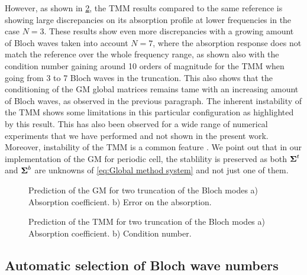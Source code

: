 However, as shown in \cref{fig:case10cond}, the TMM results compared to the same reference is showing large discrepancies on its absorption profile at lower frequencies in the case $N=3$. These results show even more discrepancies with a growing amount of Bloch waves taken into account $N=7$, where the absorption response does not match the reference over the whole frequency range, as shown also with the condition number gaining around 10 orders of magnitude for the TMM when going from 3 to 7 Bloch waves in the truncation. This also shows that the conditioning of the GM global matrices remains tame with an increasing amount of Bloch waves, as observed in the previous paragraph. The inherent instability of the TMM shows some limitations in this particular configuration as highlighted by this result. This has also been observed for a wide range of numerical experiments that we have performed and not shown in the present work. Moreover, instability of the TMM is a common feature \cite{lowe1995}. We point out that in our implementation of the GM for periodic cell, the stablility is preserved as both $\boldsymbol{\Sigma}^t$ and $\boldsymbol{\Sigma}^b$ are unknowns of \cref{eq:Global method system} and not just one of them.

\begin{figure}[htpb]
\centering
{}
\caption{Prediction of the GM for two truncation of the Bloch modes a) Absorption coefficient. b) Error on the absorption. \label{fig:case10}}
\end{figure}

\begin{figure}[htpb]
\centering
{}
\caption{Prediction of the TMM for two truncation of the Bloch modes a) Absorption coefficient. b) Condition number. \label{fig:case10cond}}
\end{figure}

\subsection{Automatic selection of Bloch wave numbers}
\label{sec:truncation}

